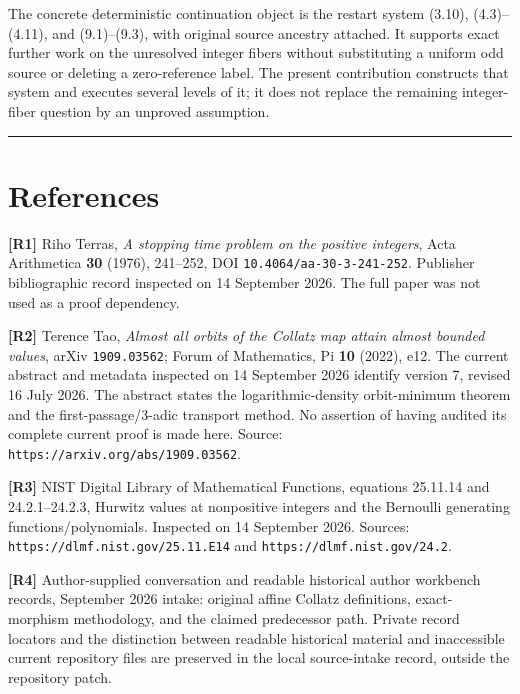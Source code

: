 The concrete deterministic continuation object is the restart system
(3.10), (4.3)--(4.11), and (9.1)--(9.3), with original source ancestry
attached. It supports exact further work on the unresolved integer
fibers without substituting a uniform odd source or deleting a
zero-reference label. The present contribution constructs that system
and executes several levels of it; it does not replace the remaining
integer-fiber question by an unproved assumption.

\begin{center}\rule{0.5\linewidth}{0.5pt}\end{center}

\section{References}

\textbf{{[}R1{]}} Riho Terras, \emph{A stopping time problem on the
positive integers}, Acta Arithmetica \textbf{30} (1976), 241--252, DOI
\nolinkurl{10.4064/aa-30-3-241-252}. Publisher bibliographic record
inspected on 14 September 2026. The full paper was not used as a proof
dependency.

\textbf{{[}R2{]}} Terence Tao, \emph{Almost all orbits of the Collatz
map attain almost bounded values}, arXiv \nolinkurl{1909.03562}; Forum
of Mathematics, Pi \textbf{10} (2022), e12. The current abstract and
metadata inspected on 14 September 2026 identify version 7, revised 16
July 2026. The abstract states the logarithmic-density orbit-minimum
theorem and the first-passage/3-adic transport method. No assertion of
having audited its complete current proof is made here. Source:
\nolinkurl{https://arxiv.org/abs/1909.03562}.

\textbf{{[}R3{]}} NIST Digital Library of Mathematical Functions,
equations 25.11.14 and 24.2.1--24.2.3, Hurwitz values at nonpositive
integers and the Bernoulli generating functions/polynomials. Inspected
on 14 September 2026. Sources:
\nolinkurl{https://dlmf.nist.gov/25.11.E14} and
\nolinkurl{https://dlmf.nist.gov/24.2}.

\textbf{{[}R4{]}} Author-supplied conversation and readable historical
author workbench records, September 2026 intake: original affine Collatz
definitions, exact-morphism methodology, and the claimed predecessor
path. Private record locators and the distinction between readable
historical material and inaccessible current repository files are
preserved in the local source-intake record, outside the repository
patch.
